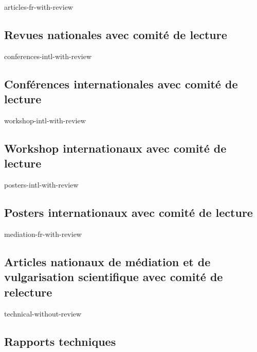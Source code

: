 \documentclass[french,9pt]{article}
\newcommand{\titre}[1]{%
  \begin{flushleft}
    \rule{\textwidth}{1pt}
    \par\vspace{0.1cm}
    \textbf{\large #1}
    \par\rule{\textwidth}{1pt}
  \end{flushleft}
}
\begin{document}


\vspace*{-5pt}
%
\setcounter{secnumdepth}{1}
\begin{btSect}[plain]{articles-fr-with-review}
  \subsection*{Revues nationales avec comit\'e de lecture}
  \btPrintAll
\end{btSect}

\vspace*{-5pt}

\begin{btSect}[plain]{conferences-intl-with-review}
  \subsection*{Conf\'erences internationales avec comit\'e de lecture}
  \btPrintAll
\end{btSect}

\vspace*{-5pt}

\begin{btSect}[plain]{workshop-intl-with-review}
 \subsection*{Workshop internationaux avec comit\'e de lecture}
 \btPrintAll
\end{btSect}

\vspace*{-5pt}

\begin{btSect}[plain]{posters-intl-with-review}
 \subsection*{Posters internationaux avec comit\'e de lecture}
 \btPrintAll
\end{btSect}

\vspace*{-5pt}

\begin{btSect}[plain]{mediation-fr-with-review}
 \subsection*{Articles nationaux de médiation et de vulgarisation scientifique avec comit\'e
 de relecture}
 \btPrintAll
\end{btSect}

\vspace*{-5pt}

\begin{btSect}[plain]{technical-without-review}
 \subsection*{Rapports techniques}
 \btPrintAll
\end{btSect}
\end{document}
